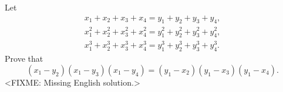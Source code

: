\problem
Let
\begin{gather*}
    x_1 + x_2 + x_3 + x_4 = y_1 + y_2 + y_3 + y_4
,\\
    x_1^2 + x_2^2 + x_3^2 + x_4^2
=
    y_1^2 + y_2^2 + y_3^2 + y_4^2
,\\
    x_1^3 + x_2^3 + x_3^3 + x_4^3
=
    y_1^3 + y_2^3 + y_3^3 + y_4^3
.\end{gather*}
Prove that
\[
    (x_1 - y_2) (x_1 - y_3) (x_1 - y_4)
=
    (y_1 - x_2) (y_1 - x_3) (y_1 - x_4)
.\]
\solution
<FIXME: Missing English solution.>
\endproblem
